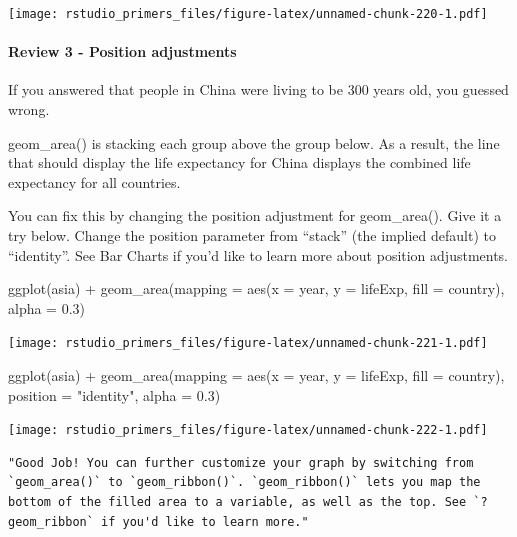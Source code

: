 \documentclass[
]{article}
\newenvironment{Shaded}{\begin{snugshade}}{\end{snugshade}}
\newcommand{\AttributeTok}[1]{\textcolor[rgb]{0.77,0.63,0.00}{#1}}
\newcommand{\FloatTok}[1]{\textcolor[rgb]{0.00,0.00,0.81}{#1}}
\newcommand{\FunctionTok}[1]{\textcolor[rgb]{0.00,0.00,0.00}{#1}}
\newcommand{\NormalTok}[1]{#1}
\newcommand{\SpecialCharTok}[1]{\textcolor[rgb]{0.00,0.00,0.00}{#1}}
\newcommand{\StringTok}[1]{\textcolor[rgb]{0.31,0.60,0.02}{#1}}
\begin{document}
\texttt{[image: rstudio\_primers\_files/figure-latex/unnamed-chunk-220-1.pdf]}

\hypertarget{review-3---position-adjustments}{%
\paragraph{Review 3 - Position
adjustments}\label{review-3---position-adjustments}}

If you answered that people in China were living to be 300 years old,
you guessed wrong.

geom\_area() is stacking each group above the group below. As a result,
the line that should display the life expectancy for China displays the
combined life expectancy for all countries.

You can fix this by changing the position adjustment for geom\_area().
Give it a try below. Change the position parameter from ``stack'' (the
implied default) to ``identity''. See Bar Charts if you'd like to learn
more about position adjustments.

\begin{Shaded}
\begin{Highlighting}[]
\FunctionTok{ggplot}\NormalTok{(asia) }\SpecialCharTok{+}
  \FunctionTok{geom\_area}\NormalTok{(}\AttributeTok{mapping =} \FunctionTok{aes}\NormalTok{(}\AttributeTok{x =}\NormalTok{ year, }\AttributeTok{y =}\NormalTok{ lifeExp, }\AttributeTok{fill =}\NormalTok{ country), }\AttributeTok{alpha =} \FloatTok{0.3}\NormalTok{)}
\end{Highlighting}
\end{Shaded}

\texttt{[image: rstudio\_primers\_files/figure-latex/unnamed-chunk-221-1.pdf]}

\begin{Shaded}
\begin{Highlighting}[]
\FunctionTok{ggplot}\NormalTok{(asia) }\SpecialCharTok{+}
  \FunctionTok{geom\_area}\NormalTok{(}\AttributeTok{mapping =} \FunctionTok{aes}\NormalTok{(}\AttributeTok{x =}\NormalTok{ year, }\AttributeTok{y =}\NormalTok{ lifeExp, }\AttributeTok{fill =}\NormalTok{ country), }\AttributeTok{position =} \StringTok{"identity"}\NormalTok{, }\AttributeTok{alpha =} \FloatTok{0.3}\NormalTok{)}
\end{Highlighting}
\end{Shaded}

\texttt{[image: rstudio\_primers\_files/figure-latex/unnamed-chunk-222-1.pdf]}

\begin{verbatim}
"Good Job! You can further customize your graph by switching from `geom_area()` to `geom_ribbon()`. `geom_ribbon()` lets you map the bottom of the filled area to a variable, as well as the top. See `?geom_ribbon` if you'd like to learn more."
\end{verbatim}
\end{document}

